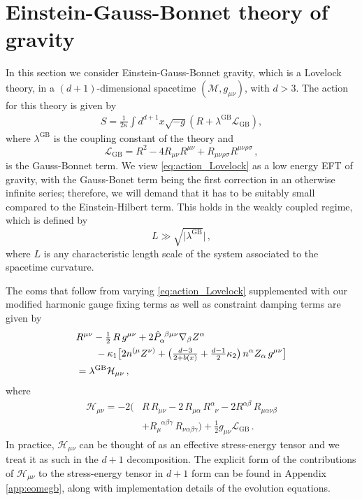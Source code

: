 \documentclass[reprint,aps,amsmath,amssymb,twoside,prd,showkeys,superscriptaddress,nofootinbib]{revtex4-2}
\begin{document}
\section{Einstein-Gauss-Bonnet theory of gravity}
\label{sec:egb}

In this section we consider Einstein-Gauss-Bonnet gravity, which is a Lovelock theory, in a $(d+1)$-dimensional spacetime $({\mathcal M}, g_{\mu\nu})$, with $d>3$. The action for this theory is given by \cite{torii}
\begin{eqnarray}
S=\tfrac{1}{2\kappa}\int d^{d+1}x\sqrt{-g}(R+\lambda^{\text{GB}}{\mathcal L}_{\text{GB}}),
\label{eq:action_Lovelock}
\end{eqnarray}
where $\lambda^{\text{GB}}$ is the coupling constant of the theory and
\begin{equation}
    {\mathcal L}_{\text{GB}}=R^2-4R_{\mu\nu}R^{\mu\nu}+R_{\mu\nu\rho\sigma}R^{\mu\nu\rho\sigma}\,,
    \label{eq:Gauss_Bonet_term}
\end{equation}
is the Gauss-Bonnet term. We view \eqref{eq:action_Lovelock}  as a low energy EFT of gravity, with the Gauss-Bonet term being the first correction in an otherwise infinite series; therefore, we will demand that it has to be suitably small compared to the Einstein-Hilbert term. This holds in the weakly coupled regime, which is defined by
\begin{equation}
    L\gg \sqrt{|\lambda^{\text{GB}}}|\,, \label{eq:weak_coupling_lovelock}
\end{equation}
where $L$ is any characteristic length scale of the system associated to the spacetime curvature. 

The eoms that follow from varying \eqref{eq:action_Lovelock} supplemented with our modified harmonic gauge fixing terms as well as constraint damping terms are given by
\begin{align}
&R^{\mu\nu}-\tfrac{1}{2}\, R \,g^{\mu\nu}+2\hat{P}_{\alpha}^{~\beta\mu\nu}\nabla_{\beta}Z^{\alpha}\nonumber
\\
&\hspace{0.7cm}-\kappa_1\big[2n^{(\mu}Z^{\nu)}+\big(\tfrac{d-3}{2+b(x)}+\tfrac{d-1}{2}\kappa_2\big)\,n^{\alpha}Z_{\alpha}\,g^{\mu\nu}\big]\nonumber\\
&= \lambda^{\text{GB}}{\mathcal H}_{\mu\nu}\,,
\label{eq:eoms_lovelock}
\end{align}
where
\begin{equation}
    \begin{aligned}
    {\mathcal H}_{\mu\nu}=-2\Big(&R\,R_ {\mu\nu}-2\,R_{\mu\alpha}\,R^{\alpha}_{\phantom{\alpha}\nu}-2R^{\alpha\beta}\,R_ {\mu\alpha\nu\beta}\\
    &+R_{\mu}^{\phantom{\mu}\alpha\beta\gamma}\,R_{\nu\alpha\beta\gamma}\Big)+\tfrac{1}{2}g_{\mu\nu}{\mathcal L}_{\text{GB}}\,.
    \label{eq:def_H_GB}
    \end{aligned}
\end{equation} 
In practice, ${\mathcal H}_{\mu\nu}$ can be thought of as an effective stress-energy tensor and we treat it as such in the $d+1$ decomposition. The explicit form of the contributions of $\mathcal{H}_{\mu\nu}$ to the stress-energy tensor in $d+1$ form can be found in Appendix \ref{app:eomegb}, along with implementation details of the evolution equations.
\end{document}
